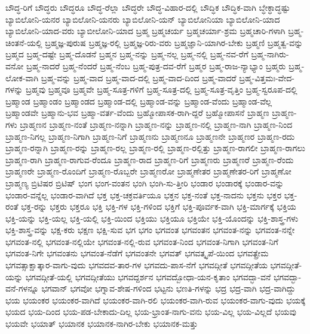{ಬೌದ್ಧ-ರಿಗೆ
ಬೌದ್ಧರು
ಬೌದ್ಧರೂ
ಬೌದ್ಧ-ರೆಲ್ಲಾ
ಬೌದ್ಧರೇ
ಬೌದ್ಧ-ವಿಹಾರ-ದಲ್ಲಿ
ಬೌದ್ಧಿಕ
ಬೌದ್ಧಿಕ-ವಾಗಿ
ಬ್ಧೇಕ್ಧಾದ್ಧಷ್ಟು
ಬ್ಯಾಬಿಲೋನಿ-ಯನರ
ಬ್ಯಾಬಿಲೋನಿ-ಯನರು
ಬ್ಯಾಬಿಲೋನಿ-ಯನ್
ಬ್ಯಾಬಿಲೋನಿಯಾ
ಬ್ಯಾಬಿಲೋನಿ-ಯಾದ
ಬ್ಯಾಬಿಲೋನಿ-ಯಾದ-ವರು
ಬ್ಯಾಬೀಲೋನಿ-ಯಾದ
ಬ್ರಹ್ಮ
ಬ್ರಹ್ಮಚರ್ಯ
ಬ್ರಹ್ಮಚರ್ಯಾ-ಶ್ರಮ
ಬ್ರಹ್ಮಚಾರಿ-ಗಳಾಗಿ
ಬ್ರಹ್ಮ-ಚಿಂತನೆ-ಯಲ್ಲಿ
ಬ್ರಹ್ಮಜ್ಞ-ಪುರುಷ
ಬ್ರಹ್ಮಜ್ಞ-ರಲ್ಲಿ
ಬ್ರಹ್ಮಜ್ಞ-ರಿರು-ವರು
ಬ್ರಹ್ಮಜ್ಞಾನಿ-ಯಾಗಿರ-ಬೇಕು
ಬ್ರಹ್ಮಣಿ
ಬ್ರಹ್ಮತ್ವ-ವನ್ನು
ಬ್ರಹ್ಮದ
ಬ್ರಹ್ಮ-ದಷ್ಟೇ
ಬ್ರಹ್ಮ-ದೊಡನೆ
ಬ್ರಹ್ಮನ
ಬ್ರಹ್ಮ-ನನ್ನು
ಬ್ರಹ್ಮ-ನಲ್ಲ
ಬ್ರಹ್ಮ-ನಲ್ಲಿ
ಬ್ರಹ್ಮ-ನವ-ರೆಗೆ
ಬ್ರಹ್ಮ-ನಾಗಿರು-ವನೋ
ಬ್ರಹ್ಮ-ನಾದರೆ
ಬ್ರಹ್ಮ-ನೆಂದರೆ
ಬ್ರಹ್ಮ-ನೆಂಬ
ಬ್ರಹ್ಮ-ಪುತ್ರ-ದವ-ರೆಗೆ
ಬ್ರಹ್ಮರ
ಬ್ರಹ್ಮ-ರಾಜ-ನ್ಯಾಭ್ಯಾಂ
ಬ್ರಹ್ಮರು
ಬ್ರಹ್ಮ-ಲೋಕ-ವಾಗಿ
ಬ್ರಹ್ಮ-ವನ್ನು
ಬ್ರಹ್ಮ-ವಾದ
ಬ್ರಹ್ಮ-ವಾದ-ದಲ್ಲಿ
ಬ್ರಹ್ಮ-ವಾದ-ದಿಂದ
ಬ್ರಹ್ಮ-ವಾದರೆ
ಬ್ರಹ್ಮ-ವಿತ್ತಮಃ-ವೇದ-ಗಳನ್ನು
ಬ್ರಹ್ಮವು
ಬ್ರಹ್ಮವೂ
ಬ್ರಹ್ಮವೇ
ಬ್ರಹ್ಮ-ಸೂತ್ರ-ಗಳಿಗೆ
ಬ್ರಹ್ಮ-ಸೂತ್ರ-ದಲ್ಲಿ
ಬ್ರಹ್ಮ-ಸೂತ್ರ-ವೃತ್ತಿಂ
ಬ್ರಹ್ಮ-ಸ್ವರೂಪ-ದಲ್ಲಿ
ಬ್ರಹ್ಮಾಂಡ
ಬ್ರಹ್ಮಾಂಡಂ
ಬ್ರಹ್ಮಾಂಡದ
ಬ್ರಹ್ಮಾಂಡ-ದಲ್ಲಿ
ಬ್ರಹ್ಮಾಂಡ-ವನ್ನು
ಬ್ರಹ್ಮಾಂಡ-ವೆಂದು
ಬ್ರಹ್ಮಾಂಡ-ವೆಲ್ಲ
ಬ್ರಹ್ಮಾಂಡವೇ
ಬ್ರಹ್ಮಾನು-ಭವ
ಬ್ರಹ್ಮಾ-ವರ್ತ-ವೆಂದು
ಬ್ರಹ್ಮೋಪಾಸಕ-ರಾಗಿ-ದ್ದರೆ
ಬ್ರಹ್ಮೋಪಾಸನೆ
ಬ್ರಾಹ್ಮಣ
ಬ್ರಾಹ್ಮಣ-ಗಳು
ಬ್ರಾಹ್ಮಣನ
ಬ್ರಾಹ್ಮಣ-ನಂತೆ
ಬ್ರಾಹ್ಮಣ-ನನ್ನಾಗಿ
ಬ್ರಾಹ್ಮಣ-ನನ್ನು
ಬ್ರಾಹ್ಮಣ-ನಲ್ಲಿ
ಬ್ರಾಹ್ಮಣ-ನಾಗಿ
ಬ್ರಾಹ್ಮಣ-ನಿಂದ
ಬ್ರಾಹ್ಮಣ-ನಿಗಲ್ಲ
ಬ್ರಾಹ್ಮಣ-ನಿಗಾಗಿ
ಬ್ರಾಹ್ಮಣ-ನಿಗೆ
ಬ್ರಾಹ್ಮಣನು
ಬ್ರಾಹ್ಮಣನೂ
ಬ್ರಾಹ್ಮಣನೇ
ಬ್ರಾಹ್ಮಣರ
ಬ್ರಾಹ್ಮಣ-ರದು
ಬ್ರಾಹ್ಮಣ-ರನ್ನಾಗಿ
ಬ್ರಾಹ್ಮಣ-ರನ್ನು
ಬ್ರಾಹ್ಮಣ-ರಲ್ಲ
ಬ್ರಾಹ್ಮಣ-ರಲ್ಲಿ
ಬ್ರಾಹ್ಮಣ-ರಲ್ಲಿತ್ತು
ಬ್ರಾಹ್ಮಣ-ರಾಗಲೀ
ಬ್ರಾಹ್ಮಣ-ರಾಗಲು
ಬ್ರಾಹ್ಮಣ-ರಾಗಿ
ಬ್ರಾಹ್ಮಣ-ರಾಗುವ-ರೆಂದೂ
ಬ್ರಾಹ್ಮಣ-ರಾದ
ಬ್ರಾಹ್ಮಣ-ರಿಗೆ
ಬ್ರಾಹ್ಮಣರು
ಬ್ರಾಹ್ಮಣರೆ
ಬ್ರಾಹ್ಮಣ-ರೆಂದು
ಬ್ರಾಹ್ಮಣರೇ
ಬ್ರಾಹ್ಮಣ-ರೊಂದಿಗೆ
ಬ್ರಾಹ್ಮಣ-ರೊಬ್ಬರೇ
ಬ್ರಾಹ್ಮಣರೋ
ಬ್ರಾಹ್ಮಣೇತರ
ಬ್ರಾಹ್ಮಣೇತರ-ರಿಗೆ
ಬ್ರಾಹ್ಮಣೋ
ಬ್ರಾಹ್ಮಣ್ಯ
ಬ್ರಿಟಿಷರ
ಬ್ರಿಟಿಷ್
ಭಂಗ
ಭಂಗ-ವಂತನ
ಭಂಗಿ
ಭಂಗಿ-ಸು-ತ್ತೀರಿ
ಭಂಡಾರ
ಭಂಡಾರಕ್ಕೆ
ಭಂಡಾರ-ವನ್ನು
ಭಂಡಾರ-ವನ್ನೆಲ್ಲ
ಭಂಡಾರ-ವಾಗಿದೆ
ಭಕ್ತ
ಭಕ್ತ-ಚಕ್ರವರ್ತಿಯೂ
ಭಕ್ತನ
ಭಕ್ತ-ನಂತೆ
ಭಕ್ತ-ನಾದನು
ಭಕ್ತನು
ಭಕ್ತರ
ಭಕ್ತ-ರಂತೆ
ಭಕ್ತ-ರನ್ನು
ಭಕ್ತರು
ಭಕ್ತರೂ
ಭಕ್ತಿ
ಭಕ್ತಿ-ಗಳ
ಭಕ್ತಿ-ಗಳಿಂದ
ಭಕ್ತಿಗೆ
ಭಕ್ತಿ-ಪೂರ್ವಕ-ವಾಗಿ
ಭಕ್ತಿ-ಮಾರ್ಗಕ್ಕೆ
ಭಕ್ತಿಯ
ಭಕ್ತಿ-ಯನ್ನು
ಭಕ್ತಿ-ಯಲ್ಲ
ಭಕ್ತಿ-ಯಲ್ಲಿ
ಭಕ್ತಿ-ಯಿಂದ
ಭಕ್ತಿಯು
ಭಕ್ತಿಯೂ
ಭಕ್ತಿಯೇ
ಭಕ್ತಿ-ಯೊಂದನ್ನು
ಭಕ್ತಿ-ಶಾಸ್ತ್ರ-ಗಳು
ಭಕ್ತಿ-ಶಾಸ್ತ್ರ-ವನ್ನು
ಭಕ್ಷ-ಕರು
ಭಕ್ಷಣ
ಭಕ್ಷಿ-ಸುವ
ಭಗ
ಭಗಂ
ಭಗವಂತ
ಭಗವಂತನ
ಭಗವಂತ-ನನ್ನು
ಭಗವಂತ-ನನ್ನೇ
ಭಗವಂತ-ನಲ್ಲಿ
ಭಗವಂತ-ನಲ್ಲಿಯೇ
ಭಗವಂತ-ನಲ್ಲಿ-ರುವ
ಭಗವಂತ-ನಿಂದ
ಭಗವಂತ-ನಿಗಾಗಿ
ಭಗವಂತ-ನಿಗೆ
ಭಗವಂತ-ನಿಗೇ
ಭಗವಂತನು
ಭಗವಂತ-ನೆಡೆಗೆ
ಭಗವಂತನೇ
ಭಗವತ್
ಭಗವತ್ಕೃಪೆ-ಯಿಂದ
ಭಗವತ್ಪ್ರೇಮ
ಭಗವತ್ಸಾಕ್ಷಾತ್ಕಾರ-ವಾಗು-ವುದು
ಭಗವದವ-ತಾರ-ಗಳ
ಭಗವದು-ಪಾಸ-ನೆಗೆ
ಭಗವದ್ಗೀತೆ
ಭಗವದ್ಗೀತೆಯ
ಭಗವದ್ಗೀತೆ-ಯನ್ನು
ಭಗವದ್ಗೀತೆ-ಯಲ್ಲಿ
ಭಗವದ್ಗೀತೆಯು
ಭಗವದ್ದರ್ಶನ
ಭಗವದ್ಬೋಧಾ-ಯನ-ಕೃತಾಂ
ಭಗವದ್ಭಾ-ವನೆ
ಭಗವದ್ಭಾ-ವನೆ-ಗಳನ್ನೂ
ಭಗವಾನ್
ಭಗವೋ
ಭಗ್ನಾವ-ಶೇಷ-ಗಳಿಂದ
ಭಟ್ಟನು
ಭಣತಿ-ಗಳನ್ನು
ಭದ್ರ
ಭದ್ರ-ವಾಗಿ
ಭದ್ರ-ವಾಗಿದ್ದು
ಭಯ
ಭಯಂಕರ
ಭಯಂಕರ-ವಾಗಿದೆ
ಭಯಂಕರ-ವಾಗಿ-ರಲಿ
ಭಯಂಕರ-ವಾಗಿ-ರುವ
ಭಯಂಕರ-ವಾಗು-ವುದು
ಭಯಕ್ಕೆ
ಭಯದ
ಭಯ-ದಿಂದ
ಭಯ-ಪಡ-ಬೇಕಾದು-ದಿಲ್ಲ
ಭಯ-ಭ್ರಾಂತ-ನಾಗು-ವನು
ಭಯ-ವಿಲ್ಲ
ಭಯ-ವಿಲ್ಲದೆ
ಭಯವು
ಭಯವೇ
ಭಯಾತ್
ಭಯಾನಕ
ಭಯಾನಕ-ನಾಗಿರ-ಬೇಕು
ಭಯಾನಕ-ಮತ್ತು
}
